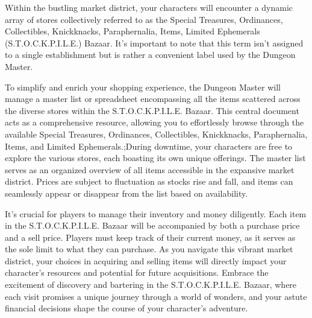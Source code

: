 Within the bustling market district, your characters will encounter a dynamic array of stores collectively referred to as the Special Treasures, Ordinances, Collectibles, Knickknacks, Paraphernalia, Items, Limited Ephemerals (S.T.O.C.K.P.I.L.E.) Bazaar. It's important to note that this term isn't assigned to a single establishment but is rather a convenient label used by the Dungeon Master.

To simplify and enrich your shopping experience, the Dungeon Master will manage a master list or spreadsheet encompassing all the items scattered across the diverse stores within the S.T.O.C.K.P.I.L.E. Bazaar. This central document acts as a comprehensive resource, allowing you to effortlessly browse through the available Special Treasures, Ordinances, Collectibles, Knickknacks, Paraphernalia, Items, and Limited Ephemerals.;During downtime, your characters are free to explore the various stores, each boasting its own unique offerings. The master list serves as an organized overview of all items accessible in the expansive market district. Prices are subject to fluctuation as stocks rise and fall, and items can seamlessly appear or disappear from the list based on availability.

It's crucial for players to manage their inventory and money diligently. Each item in the S.T.O.C.K.P.I.L.E. Bazaar will be accompanied by both a purchase price and a sell price. Players must keep track of their current money, as it serves as the sole limit to what they can purchase. As you navigate this vibrant market district, your choices in acquiring and selling items will directly impact your character's resources and potential for future acquisitions. Embrace the excitement of discovery and bartering in the S.T.O.C.K.P.I.L.E. Bazaar, where each visit promises a unique journey through a world of wonders, and your astute financial decisions shape the course of your character's adventure.
